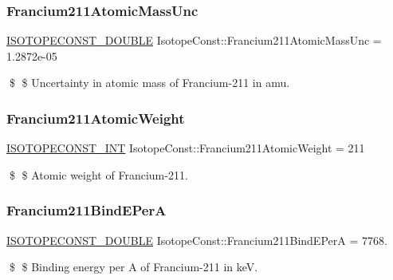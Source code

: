 \subsubsection{\texorpdfstring{Francium211\+Atomic\+Mass\+Unc}{Francium211AtomicMassUnc}}
{\footnotesize\ttfamily \mbox{\hyperlink{group___isotope_const-_macros_ga8f45a7272ce02c0b4c65c44636ed719a}{I\+S\+O\+T\+O\+P\+E\+C\+O\+N\+S\+T\+\_\+\+D\+O\+U\+B\+LE}} Isotope\+Const\+::\+Francium211\+Atomic\+Mass\+Unc = 1.\+2872e-\/05}

\$ \$ Uncertainty in atomic mass of Francium-\/211 in amu. \mbox{\label{group___isotope_const-_francium-_fr211_gaea0e930bc6a2a191b1166e2e9696f0cb}} 
\subsubsection{\texorpdfstring{Francium211\+Atomic\+Weight}{Francium211AtomicWeight}}
{\footnotesize\ttfamily \mbox{\hyperlink{group___isotope_const-_macros_ga5f18360b3e99483a35c32d789e62621c}{I\+S\+O\+T\+O\+P\+E\+C\+O\+N\+S\+T\+\_\+\+I\+NT}} Isotope\+Const\+::\+Francium211\+Atomic\+Weight = 211}

\$ \$ Atomic weight of Francium-\/211. \mbox{\label{group___isotope_const-_francium-_fr211_gacc7f3747c9bf47d208247e2d4f415c67}} 
\subsubsection{\texorpdfstring{Francium211\+Bind\+E\+PerA}{Francium211BindEPerA}}
{\footnotesize\ttfamily \mbox{\hyperlink{group___isotope_const-_macros_ga8f45a7272ce02c0b4c65c44636ed719a}{I\+S\+O\+T\+O\+P\+E\+C\+O\+N\+S\+T\+\_\+\+D\+O\+U\+B\+LE}} Isotope\+Const\+::\+Francium211\+Bind\+E\+PerA = 7768.}

\$ \$ Binding energy per A of Francium-\/211 in keV. \mbox{\label{group___isotope_const-_francium-_fr211_gac2a04a2618af4dd5fd3d94a7051f23dc}} 
